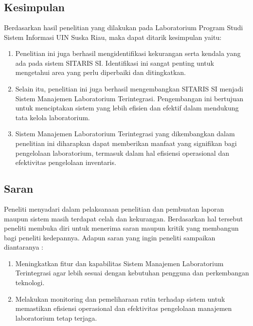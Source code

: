%
%
%
%


\chapter{\babEnam}
\section{Kesimpulan}
Berdasarkan hasil penelitian yang dilakukan pada Laboratorium Program Studi Sistem Informasi UIN Suska Riau, maka dapat ditarik kesimpulan yaitu:

\begin{enumerate}
	\item Penelitian ini juga berhasil mengidentifikasi kekurangan serta kendala yang ada pada sistem SITARIS SI. Identifikasi ini sangat penting untuk mengetahui area yang perlu diperbaiki dan ditingkatkan.
	\item Selain itu, penelitian ini juga berhasil mengembangkan SITARIS SI menjadi Sistem Manajemen Laboratorium Terintegrasi. Pengembangan ini bertujuan untuk menciptakan sistem yang lebih efisien dan efektif dalam mendukung tata kelola laboratorium.
	\item Sistem Manajemen Laboratorium Terintegrasi yang dikembangkan dalam penelitian ini diharapkan dapat memberikan manfaat yang signifikan bagi pengelolaan laboratorium, termasuk dalam hal efisiensi operasional dan efektivitas pengelolaan inventaris.
\end{enumerate}

\section{Saran}
Peneliti menyadari dalam pelaksanaan penelitian dan pembuatan laporan maupun sistem masih terdapat celah dan kekurangan. Berdasarkan hal tersebut peneliti membuka diri untuk menerima saran maupun kritik yang membangun bagi peneliti kedepannya. Adapun saran yang ingin peneliti sampaikan diantaranya :

\begin{enumerate}
	\item Meningkatkan fitur dan kapabilitas Sistem Manajemen Laboratorium Terintegrasi agar lebih sesuai dengan kebutuhan pengguna dan perkembangan teknologi.
	\item Melakukan monitoring dan pemeliharaan rutin terhadap sistem untuk memastikan efisiensi operasional dan efektivitas pengelolaan manajemen laboratorium tetap terjaga.
\end{enumerate}